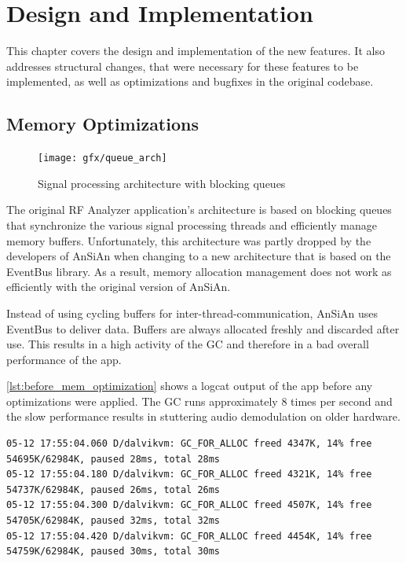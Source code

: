\chapter{Design and Implementation}\label{ch:design_and_implementation}

This chapter covers the design and implementation of the new features. It also addresses structural changes, that were necessary for these features to be implemented, as well as optimizations and bugfixes in the original codebase.


\section{Memory Optimizations\label{sec:cleanup.mem}}

\begin{figure}
	\centering
	\texttt{[image: gfx/queue\_arch]}
	\caption{Signal processing architecture with blocking queues}
	\label{fig:queue_architecture}
\end{figure}

The original RF Analyzer application's architecture is based on
blocking queues that synchronize the various signal processing threads
and efficiently manage memory buffers. Unfortunately, this
architecture was partly dropped by the developers of \ac{AnSiAn} when
changing to a new architecture that is based on the EventBus library. As a result, memory
allocation management does not work as efficiently with the original version
of \ac{AnSiAn}.

Instead of using cycling buffers for inter-thread-communication, \ac{AnSiAn} uses
EventBus to deliver data. Buffers are always allocated freshly
and discarded after use. This results in a high activity of the
\ac{GC} and therefore in a bad overall performance of the app.

\autoref{lst:before_mem_optimization} shows a logcat output of the
app before any optimizations were applied. The \ac{GC} runs approximately 8 times per second
and the slow performance results in stuttering audio demodulation on
older hardware.

\begin{lstlisting}[label=lst:before_mem_optimization, caption=Logcat output
before memory optimizations, language=none]
05-12 17:55:04.060 D/dalvikvm: GC_FOR_ALLOC freed 4347K, 14% free 54695K/62984K, paused 28ms, total 28ms
05-12 17:55:04.180 D/dalvikvm: GC_FOR_ALLOC freed 4321K, 14% free 54737K/62984K, paused 26ms, total 26ms
05-12 17:55:04.300 D/dalvikvm: GC_FOR_ALLOC freed 4507K, 14% free 54705K/62984K, paused 32ms, total 32ms
05-12 17:55:04.420 D/dalvikvm: GC_FOR_ALLOC freed 4454K, 14% free 54759K/62984K, paused 30ms, total 30ms
\end{lstlisting}


